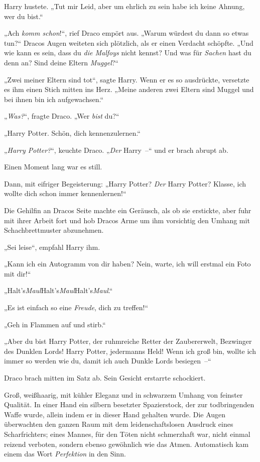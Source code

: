 {Harry hustete. „Tut mir Leid, aber um ehrlich zu sein habe ich keine Ahnung, wer du bist.“

„Ach \emph{komm schon}!“, rief Draco empört aus. „Warum würdest du dann so etwas tun?“ Dracos Augen weiteten sich plötzlich, als er einen Verdacht schöpfte. „Und wie kann es sein, dass du \emph{die Malfoys} nicht kennst? Und was für \emph{Sachen} hast du denn an? Sind deine Eltern \emph{Muggel}?“

„Zwei meiner Eltern sind tot“, sagte Harry. Wenn er es so ausdrückte, versetzte es ihm einen Stich mitten ins Herz. „Meine anderen zwei Eltern sind Muggel und bei ihnen bin ich aufgewachsen.“

„\emph{Was?}“, fragte Draco. „Wer \emph{bist} du?“

„Harry Potter. Schön, dich kennenzulernen.“

„\emph{Harry Potter?}“, keuchte Draco. „\emph{Der} Harry~--“ und er brach abrupt ab.

Einen Moment lang war es still.

Dann, mit eifriger Begeisterung: „Harry Potter? \emph{Der} Harry Potter? Klasse, ich wollte dich schon immer kennenlernen!“

Die Gehilfin an Dracos Seite machte ein Geräusch, als ob sie erstickte, aber fuhr mit ihrer Arbeit fort und hob Dracos Arme um ihm vorsichtig den Umhang mit Schachbrettmuster abzunehmen.

„Sei leise“, empfahl Harry ihm.

„Kann ich ein Autogramm von dir haben? Nein, warte, ich will erstmal ein Foto mit dir!“

„Halt's\emph{Maul}Halt's\emph{Maul}Halt's\emph{Maul}.“

„Es ist einfach so eine \emph{Freude}, dich zu treffen!“

„Geh in Flammen auf und stirb.“

„Aber du bist Harry Potter, der ruhmreiche Retter der Zaubererwelt, Bezwinger des Dunklen Lords! Harry Potter, jedermanns Held! Wenn ich groß bin, wollte ich immer so werden wie du, damit ich auch Dunkle Lords besiegen~--“

Draco brach mitten im Satz ab. Sein Gesicht erstarrte schockiert.

Groß, weißhaarig, mit kühler Eleganz und in schwarzem Umhang von feinster Qualität. In einer Hand ein silbern besetzter Spazierstock, der zur todbringenden Waffe wurde, allein indem er in dieser Hand gehalten wurde. Die Augen überwachten den ganzen Raum mit dem leidenschaftslosen Ausdruck eines Scharfrichters; eines Mannes, für den Töten nicht schmerzhaft war, nicht einmal reizend verboten, sondern ebenso gewöhnlich wie das Atmen. Automatisch kam einem das Wort \emph{Perfektion} in den Sinn.

}

